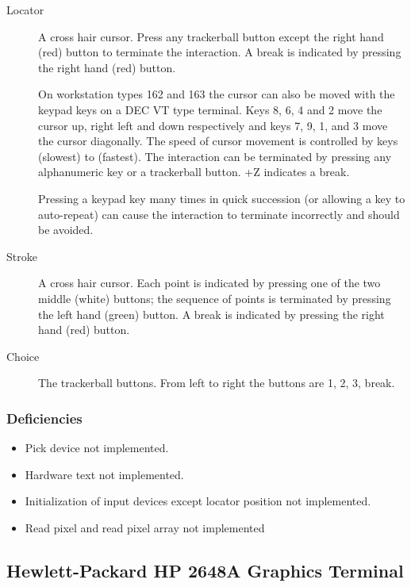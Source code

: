 \begin{description}

\item[Locator] A cross hair cursor.
Press any trackerball button except the right hand (red) button to terminate
the interaction.
A break is indicated by pressing the right hand (red) button.

On workstation types 162 and 163 the cursor can also be moved with the keypad
keys on a DEC VT type terminal. Keys 8, 6, 4 and 2 move the cursor up, right
left and down respectively and keys 7, 9, 1, and 3 move the cursor diagonally.
The speed of cursor movement is controlled by keys  (slowest) to
 (fastest). The interaction can be terminated by pressing any
alphanumeric key or a trackerball button. +Z indicates a break. 

Pressing a keypad key many times in quick succession (or allowing a key to
auto-repeat) can cause the interaction to terminate incorrectly and should
be avoided.

\item[Stroke] A cross hair cursor.
Each point is indicated by pressing one of the two middle (white) buttons;
the sequence of points is terminated by pressing the left hand (green) button.
A break is indicated by pressing the right hand (red) button.

\item[Choice] The trackerball buttons.
From left to right the buttons are 1, 2, 3, break.

\end{description}

\subsubsection{Deficiencies}
\begin{itemize}
\item Pick device not implemented.
\item Hardware text not implemented.
\item Initialization of input devices except locator position not implemented.
\item Read pixel and read pixel array not implemented
\end{itemize}                    

\subsection{Hewlett-Packard HP 2648A Graphics Terminal}
\label{hpgt}
